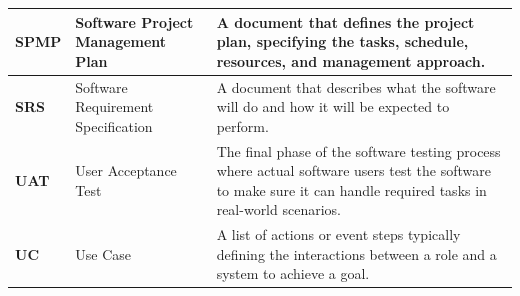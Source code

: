 \documentclass[12pt,a4paper]{article}
\begin{document}
\begin{longtable}{|p{2.2cm}|p{4.4cm}|p{7.0cm}|}
    \textbf{SPMP} & Software Project Management Plan & A document that defines the project plan, specifying the tasks, schedule, resources, and management approach. \\ \hline
    \textbf{SRS} & Software Requirement Specification & A document that describes what the software will do and how it will be expected to perform. \\ \hline
    \textbf{UAT} & User Acceptance Test & The final phase of the software testing process where actual software users test the software to make sure it can handle required tasks in real-world scenarios. \\ \hline
    \textbf{UC} & Use Case & A list of actions or event steps typically defining the interactions between a role and a system to achieve a goal. \\ \hline
\end{longtable}

\newpage







\end{document}
